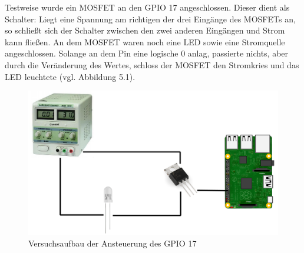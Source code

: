 Testweise wurde ein MOSFET an den GPIO 17 angeschlossen. Dieser dient als Schalter: Liegt eine Spannung am richtigen der drei Eingänge des MOSFETs an, so schließt sich der Schalter zwischen den zwei anderen Eingängen und Strom kann fließen. An dem MOSFET waren noch eine LED sowie eine Stromquelle angeschlossen. Solange an dem Pin eine logische 0 anlag, passierte nichts, aber durch die Veränderung des Wertes, schloss der MOSFET den Stromkries und das LED leuchtete (vgl. Abbildung 5.1). \\
\begin{figure}[htb]
  \centering  
  \includegraphics[scale=1]{img/versuchsaufbau.png}
  \caption{Versuchsaufbau der Ansteuerung des GPIO 17}
  \label{fig:starwars}
\end{figure}


